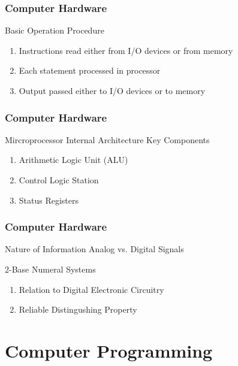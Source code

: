 \documentclass[10pt, compress]{beamer}
\begin{document}
\begin{frame}
	\frametitle{Computer Hardware}
	\begin{block}{Basic Operation Procedure}
		\begin{enumerate}
			\item[] Instructions read either from I/O devices or from memory
			\item[] Each statement processed in processor
			\item[] Output passed either to I/O devices or to memory
		\end{enumerate}
	\end{block}
\end{frame}

\begin{frame}
	\frametitle{Computer Hardware}
	\begin{block}{Mircroprocessor Internal Architecture}
		Key Components
		\begin{enumerate}
			\item[] Arithmetic Logic Unit (ALU)
			\item[] Control Logic Station
			\item[] Status Registers
		\end{enumerate}
	\end{block}
\end{frame}

\begin{frame}
	\frametitle{Computer Hardware}
	\begin{block}{Nature of Information}
		Analog vs. Digital Signals

		2-Base Numeral Systems
		\begin{enumerate}
			\item[] Relation to Digital Electronic Circuitry
			\item[] Reliable Distingushing Property
		\end{enumerate}
	\end{block}
\end{frame}

\section{Computer Programming}
\end{document}
